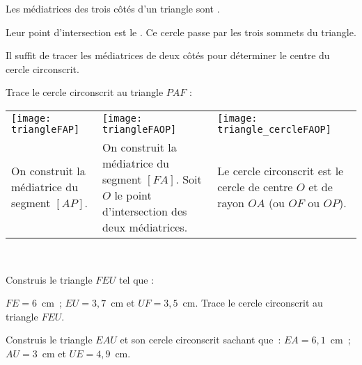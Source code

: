 \begin{methode*1}
 
 \begin{aconnaitre}
Les médiatrices des trois côtés d'un triangle sont .

Leur point d'intersection est le . Ce cercle passe par les trois sommets du triangle.
\end{aconnaitre}


\begin{remarque}
Il suffit de tracer les médiatrices de deux côtés pour déterminer le centre du cercle circonscrit.
 \end{remarque}
 
 \begin{exemple*1}
Trace le cercle circonscrit au triangle $PAF$ :
 \begin{tabularx}{\textwidth}{X|X|X}
 \texttt{[image: triangleFAP]} &  \texttt{[image: triangleFAOP]} & \texttt{[image: triangle\_cercleFAOP]} \\ 
 On construit la médiatrice du segment $[AP]$. & On construit la médiatrice du segment $[FA]$. Soit $O$ le point d'intersection des deux médiatrices. & Le cercle circonscrit est le cercle de centre $O$ et de rayon $OA$ (ou $OF$ ou $OP$). \\
\end{tabularx} \\

\end{exemple*1}

\exercice
Construis le triangle $FEU$ tel que :

$FE = 6$ cm ; $EU = 3,7$ cm et $UF = 3,5$ cm. Trace le cercle circonscrit au triangle $FEU$.

\exercice
Construis le triangle $EAU$ et son cercle circonscrit sachant que : $EA = 6,1$ cm ; $AU = 3$ cm et $UE = 4,9$ cm.

\end{methode*1}


 
